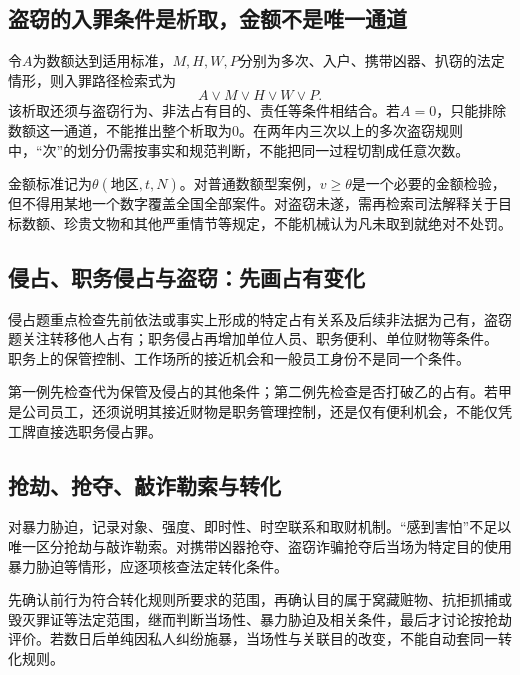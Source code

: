 \subsection{盗窃的入罪条件是析取，金额不是唯一通道}

令$A$为数额达到适用标准，$M,H,W,P$分别为多次、入户、携带凶器、扒窃的法定情形，则入罪路径检索式为
\[
 A\vee M\vee H\vee W\vee P.
\]
该析取还须与盗窃行为、非法占有目的、责任等条件相结合。若$A=0$，只能排除数额这一通道，不能推出整个析取为$0$。在两年内三次以上的多次盗窃规则中，“次”的划分仍需按事实和规范判断，不能把同一过程切割成任意次数。

金额标准记为$\theta(\text{地区},t,N)$。对普通数额型案例，$v\ge\theta$是一个必要的金额检验，但不得用某地一个数字覆盖全国全部案件。对盗窃未遂，需再检索司法解释关于目标数额、珍贵文物和其他严重情节等规定，不能机械认为凡未取到就绝对不处罚。

\subsection{侵占、职务侵占与盗窃：先画占有变化}
侵占题重点检查先前依法或事实上形成的特定占有关系及后续非法据为己有，盗窃题关注转移他人占有；职务侵占再增加单位人员、职务便利、单位财物等条件。 职务上的保管控制、工作场所的接近机会和一般员工身份不是同一个条件。

第一例先检查代为保管及侵占的其他条件；第二例先检查是否打破乙的占有。若甲是公司员工，还须说明其接近财物是职务管理控制，还是仅有便利机会，不能仅凭工牌直接选职务侵占罪。

\subsection{抢劫、抢夺、敲诈勒索与转化}
对暴力胁迫，记录对象、强度、即时性、时空联系和取财机制。“感到害怕”不足以唯一区分抢劫与敲诈勒索。对携带凶器抢夺、盗窃诈骗抢夺后当场为特定目的使用暴力胁迫等情形，应逐项核查法定转化条件。

先确认前行为符合转化规则所要求的范围，再确认目的属于窝藏赃物、抗拒抓捕或毁灭罪证等法定范围，继而判断当场性、暴力胁迫及相关条件，最后才讨论按抢劫评价。若数日后单纯因私人纠纷施暴，当场性与关联目的改变，不能自动套同一转化规则。


